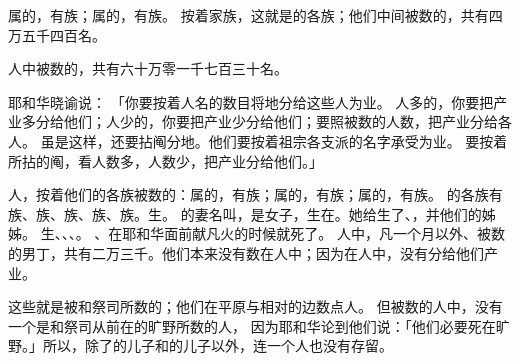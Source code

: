 {属{}的，有{}族；属{}的，有{}族。
按着家族，这就是{}的各族；他们中间被数的，共有四万五千四百名。
\par }{\PP {}人中被数的，共有六十万零一千七百三十名。
\par }{\PP {}耶和华晓谕{}说：
「你要按着人名的数目将地分给这些人为业。
人多的，你要把产业多分给他们；人少的，你要把产业少分给他们；要照被数的人数，把产业分给各人。
虽是这样，还要拈阄分地。他们要按着祖宗各支派的名字承受为业。
要按着所拈的阄，看人数多，人数少，把产业分给他们。」
\par }{\PP {}人，按着他们的各族被数的：属{}的，有{}族；属{}的，有{}族；属{}的，有{}族。
的各族有{}族、{}族、{}族、{}族、{}族。{}生{}。
的妻名叫{}，是{}女子，生在{}。她给{}生了{}、{}，并他们的姊姊{}。
生{}、{}、{}、{}。
、{}在耶和华面前献凡火的时候就死了。
人中，凡一个月以外、被数的男丁，共有二万三千。他们本来没有数在{}人中；因为在{}人中，没有分给他们产业。
\par }{\PP {}这些就是被{}和祭司{}所数的；他们在{}平原与{}相对的{}边数点{}人。
但被数的人中，没有一个是{}和祭司{}从前在{}的旷野所数的{}人，
因为耶和华论到他们说：「他们必要死在旷野。」所以，除了{}的儿子{}和{}的儿子{}以外，连一个人也没有存留。

}
